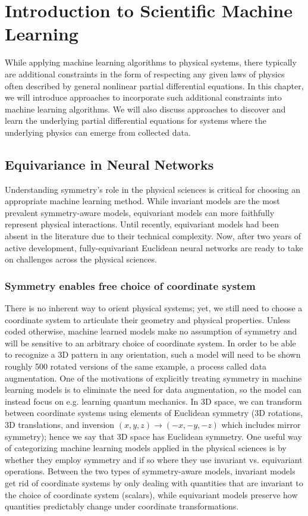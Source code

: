 \documentclass[book.tex]{subfiles}
\begin{document}
\chapter{Introduction to Scientific Machine Learning}
\label{ch:intro-molecular-ml}
While applying machine learning algorithms to physical systems, there typically are additional constraints in the form of respecting any given laws of physics often described by general nonlinear partial differential equations. In this chapter, we will introduce approaches to incorporate such additional constraints into machine learning algorithms. We will also discuss approaches to discover and learn the underlying partial differential equations for systems where the underlying physics can emerge from collected data. 

\section{Equivariance in Neural Networks}

Understanding symmetry's role in the physical sciences is critical for choosing an appropriate machine learning
method. While invariant models are the most prevalent symmetry-aware models, equivariant models can more
faithfully represent physical interactions. Until recently, equivariant models had been absent in the literature due
to their technical complexity. Now, after two years of active development, fully-equivariant Euclidean neural networks are ready to take on challenges across the physical sciences.

\subsection{Symmetry enables free choice of coordinate system}
There is no inherent way to orient physical systems; yet, we still need to choose a coordinate system to articulate their geometry and physical properties. Unless coded otherwise, machine learned models make no assumption of symmetry and will be sensitive to an arbitrary choice of coordinate system. In order to be able to recognize a 3D pattern in any orientation, such a model will need to be shown roughly 500 rotated versions of the same example, a process called data augmentation. One of the motivations of explicitly treating symmetry in machine learning models is to eliminate the need for
data augmentation, so the model can instead focus on e.g. learning quantum mechanics. In 3D space, we can transform between coordinate systems using elements of Euclidean symmetry (3D rotations, 3D translations, and inversion $(x, y, z) \rightarrow (-x, -y, -z)$ which includes mirror symmetry); hence we say that 3D space has Euclidean symmetry. One useful way of categorizing machine learning models applied in the physical sciences is by whether they employ symmetry and if so where they use invariant vs. equivariant operations. Between the two types of symmetry-aware models, invariant models get rid of coordinate systems by only dealing with quantities that are invariant to the choice of coordinate system (scalars),
while equivariant models preserve how quantities predictably change under coordinate transformations.
\end{document}
